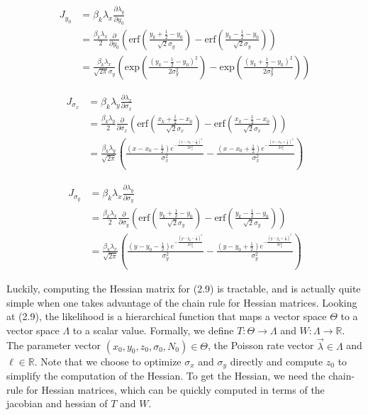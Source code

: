 \documentclass{ucetd}
\begin{document}
\begin{align*}
J_{y_{0}} &= \beta_{k}\lambda_{x}\frac{\partial \lambda_{y}}{\partial y_{0}} \\
&= \frac{\beta_{k}\lambda_{x}}{2}\frac{\partial}{\partial y_{0}}\left(\mathrm{erf}\left(\frac{y_{k}+\frac{1}{2}-y_{0}}{\sqrt{2}\sigma_{y}}\right) -\mathrm{erf}\left(\frac{y_{k}-\frac{1}{2}-y_{0}}{\sqrt{2}\sigma_{y}}\right)\right)\\
&= \frac{\beta_{k}\lambda_{x}}{\sqrt{2\pi}\sigma_{y}}\left(\mathrm{exp}\left(\frac{(y_{k}-\frac{1}{2}-y_{0})^{2}}{2\sigma_{y}^{2}}\right) -\mathrm{exp}\left(\frac{(y_{k}+\frac{1}{2}-y_{0})^{2}}{2\sigma_{y}^{2}}\right)\right)
\end{align*}

\begin{align*}
J_{\sigma_{x}} &= \beta_{k}\lambda_{y}\frac{\partial \lambda_{x}}{\partial \sigma_{x}} \\
&= \frac{\beta_{k}\lambda_{y}}{2}\frac{\partial}{\partial \sigma_{x}}\left(\mathrm{erf}\left(\frac{x_{k}+\frac{1}{2}-x_{0}}{\sqrt{2}\sigma_{x}}\right) -\mathrm{erf}\left(\frac{x_{k}-\frac{1}{2}-x_{0}}{\sqrt{2}\sigma_{x}}\right)\right)\\
&= \frac{\beta_{k}\lambda_{y}}{\sqrt{2\pi}}\left(\frac{\left(x-x_{0}-\frac{1}{2}\right) e^{-\frac{\left(x-x_{0}-\frac{1}{2}\right)^2}{2 \sigma_{x} ^2}}}{\sigma_{x} ^2}-\frac{ \left(x-x_{0}+\frac{1}{2}\right) e^{-\frac{\left(x-x_{0}+\frac{1}{2}\right)^2}{2 \sigma_{x} ^2}}}{\sigma_{x} ^2}\right)
\end{align*}

\begin{align*}
J_{\sigma_{y}} &= \beta_{k}\lambda_{x}\frac{\partial \lambda_{y}}{\partial \sigma_{y}} \\
&= \frac{\beta_{k}\lambda_{x}}{2}\frac{\partial}{\partial \sigma_{y}}\left(\mathrm{erf}\left(\frac{y_{k}+\frac{1}{2}-y_{0}}{\sqrt{2}\sigma_{y}}\right) -\mathrm{erf}\left(\frac{y_{k}-\frac{1}{2}-y_{0}}{\sqrt{2}\sigma_{y}}\right)\right)\\
&= \frac{\beta_{k}\lambda_{x}}{\sqrt{2\pi}}\left(\frac{\left(y-y_{0}-\frac{1}{2}\right) e^{-\frac{\left(y-y_{0}-\frac{1}{2}\right)^2}{2 \sigma_{y} ^2}}}{\sigma_{y} ^2}-\frac{ \left(y-y_{0}+\frac{1}{2}\right) e^{-\frac{\left(y-y_{0}+\frac{1}{2}\right)^2}{2 \sigma_{y} ^2}}}{\sigma_{y} ^2}\right)
\end{align*}

Luckily, computing the Hessian matrix for (2.9) is tractable, and is actually quite simple when one takes advantage of the chain rule for Hessian matrices. Looking at (2.9), the likelihood is a hierarchical function that maps a vector space $\Theta$ to a vector space $\Lambda$ to a scalar value. Formally, we define $T: \Theta \rightarrow \Lambda$ and $W: \Lambda \rightarrow \mathbb{R}$. The parameter vector $(x_{0},y_{0},z_{0}, \sigma_{0}, N_{0})\in \Theta$, the Poisson rate vector $\vec{\lambda} \in \Lambda$ and $\ell \in \mathbb{R}$. Note that we choose to optimize $\sigma_{x}$ and $\sigma_{y}$ directly and compute $z_{0}$ to simplify the computation of the Hessian. To get the Hessian, we need the chain-rule for Hessian matrices, which can be quickly computed in terms of the jacobian and hessian of $T$ and $W$.
\end{document}
